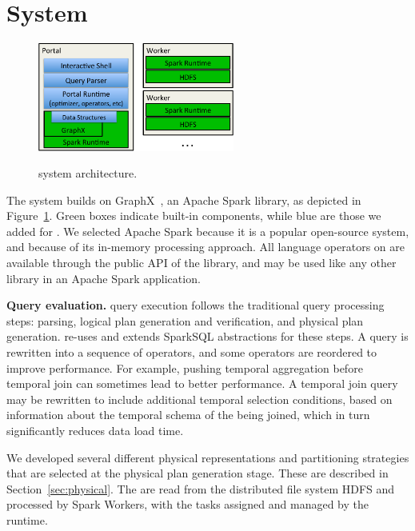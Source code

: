 \section{System}
\label{sec:sys}

\begin{figure}[t!]
\begin{center}
\includegraphics[height=1.4in]{figs/architecture.pdf}
\caption{\ql system architecture.}
\vspace{-0.5cm}
\label{fig:arch}
\vspace{-0.2cm}
\end{center}
\end{figure}

The \ql system builds on GraphX~\cite{DBLP:conf/osdi/GonzalezXDCFS14},
an Apache Spark library, as depicted in Figure~\ref{fig:arch}.  Green
boxes indicate built-in components, while blue are those we added for
\ql.  We selected Apache Spark because it is a popular open-source
system, and because of its in-memory processing approach.  All
language operators on \tgs are available through the public API of the
\ql library, and may be used like any other library in an Apache Spark
application.

{\bf Query evaluation.}  \ql query execution follows the traditional
query processing steps: parsing, logical plan generation and
verification, and physical plan generation.  \ql re-uses and extends
SparkSQL abstractions for these steps.  A \ql query is rewritten into
a sequence of operators, and some operators are reordered to improve
performance.  For example, pushing temporal aggregation before
temporal join can sometimes lead to better performance.  A temporal
join query may be rewritten to include additional temporal selection
conditions, based on information about the temporal schema of the \tgs
being joined, which in turn significantly reduces data load time.

We developed several different physical representations and
partitioning strategies that are selected at the physical plan
generation stage.  These are described in Section~\ref{sec:physical}.
The \tgs are read from the distributed file system HDFS and processed
by Spark Workers, with the tasks assigned and managed by the runtime.

